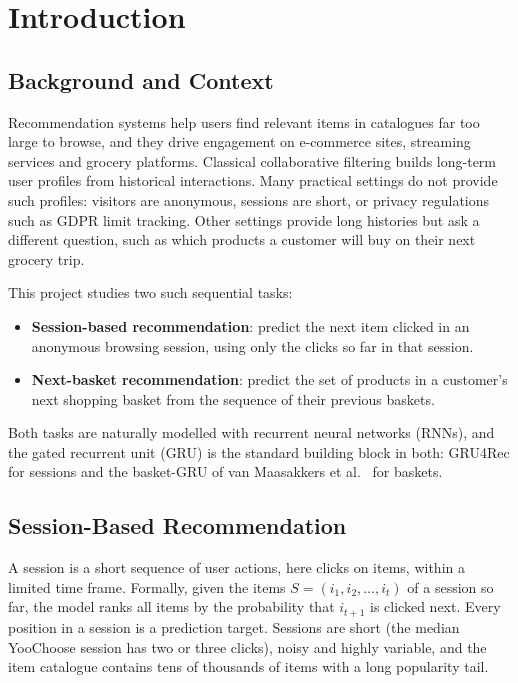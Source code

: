 \documentclass[12pt,a4paper]{report}
\begin{document}

\chapter{Introduction}

\section{Background and Context}

Recommendation systems help users find relevant items in catalogues far too
large to browse, and they drive engagement on e-commerce sites, streaming
services and grocery platforms. Classical collaborative filtering builds
long-term user profiles from historical interactions. Many practical settings do
not provide such profiles: visitors are anonymous, sessions are short, or
privacy regulations such as GDPR limit tracking. Other settings provide long
histories but ask a different question, such as which products a customer will
buy on their next grocery trip.

This project studies two such sequential tasks:

\begin{itemize}
    \item \textbf{Session-based recommendation}: predict the next item clicked in
          an anonymous browsing session, using only the clicks so far in that
          session.
    \item \textbf{Next-basket recommendation}: predict the set of products in a
          customer's next shopping basket from the sequence of their previous
          baskets.
\end{itemize}

Both tasks are naturally modelled with recurrent neural networks (RNNs), and
the gated recurrent unit (GRU) is the standard building block in both: GRU4Rec
for sessions \cite{hidasi2016,hidasi2018} and the basket-GRU of van Maasakkers
et al.\ \cite{vanmaasakkers2023} for baskets.

\section{Session-Based Recommendation}

A session is a short sequence of user actions, here clicks on items, within a
limited time frame. Formally, given the items $S = (i_1, i_2, \ldots, i_t)$ of a
session so far, the model ranks all items by the probability that $i_{t+1}$ is
clicked next. Every position in a session is a prediction target. Sessions are
short (the median YooChoose session has two or three clicks), noisy and highly
variable, and the item catalogue contains tens of thousands of items with a long
popularity tail.
\end{document}
